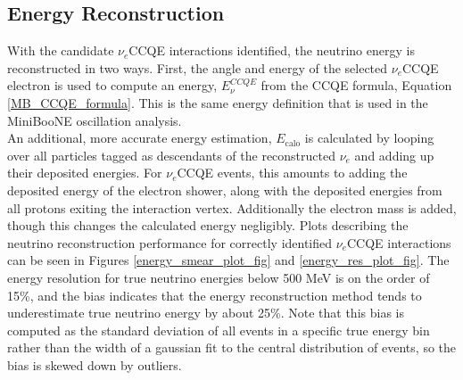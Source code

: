 \subsection{Energy Reconstruction}\label{LEE_EnergyReco_section}

With the candidate $\nu_e$CCQE interactions identified, the neutrino energy is reconstructed in two ways. First, the angle and energy of the selected $\nu_e$CCQE electron is used to compute an energy, $E_\nu^{CCQE}$ from the CCQE formula, Equation \ref{MB_CCQE_formula}. This is the same energy definition that is used in the MiniBooNE oscillation analysis.\\

An additional, more accurate energy estimation, $E_{\text{calo}}$ is calculated by looping over all particles tagged as descendants of the reconstructed $\nu_e$ and adding up their deposited energies. For $\nu_e$CCQE events, this amounts to adding the deposited energy of the electron shower, along with the deposited energies from all protons exiting the interaction vertex. Additionally the electron mass is added, though this changes the calculated energy negligibly. Plots describing the neutrino reconstruction performance for correctly identified $\nu_e$CCQE interactions can be seen in Figures \ref{energy_smear_plot_fig} and \ref{energy_res_plot_fig}. The energy resolution for true neutrino energies below 500 MeV is on the order of 15\%, and the bias indicates that the energy reconstruction method tends to underestimate true neutrino energy by about 25\%. Note that this bias is computed as the standard deviation of all events in a specific true energy bin rather than the width of a gaussian fit to the central distribution of events, so the bias is skewed down by outliers.

